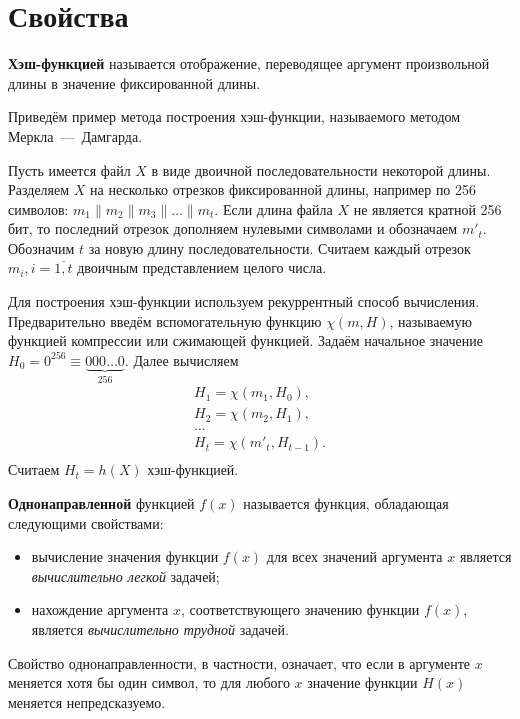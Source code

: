 \section{Свойства}

\textbf{Хэш-функцией} называется отображение, переводящее аргумент произвольной длины в значение фиксированной длины.

\example
Приведём пример метода построения хэш-функции, называемого методом Меркла~---~Дамгарда.~\cite{Merkle:1979, Merkle:1990, Damgard:1990}

Пусть имеется файл $X$ в виде двоичной последовательности некоторой длины. Разделяем $X$ на несколько отрезков фиксированной длины, например по 256 символов:  $m_{1} \| m_{2} \| m_{3} \| \ldots \| m_{t}$. Если длина файла $X$ не является кратной 256 бит, то последний отрезок дополняем нулевыми символами и обозначаем $m'_{t}$.
Обозначим $t$ за новую длину последовательности. Считаем каждый отрезок $m_i, i = \overline{1,t}$ двоичным представлением целого числа.

Для построения хэш-функции используем рекуррентный способ вычисления. Предварительно введём вспомогательную функцию $\chi(m, H)$, называемую функцией компрессии или сжимающей функцией. Задаём начальное значение $H_{0} = 0^{256} \equiv \underbrace{000 \ldots 0}_{256} $. Далее вычисляем
\[ \begin{array}{l}
    H_1 = \chi( m_1, H_0), \\
    H_2 = \chi( m_2, H_1), \\
    \dots \\
    H_t = \chi( m'_t, H_{t-1}). \\
\end{array} \]
Считаем $H_{t} = h(X)$ хэш-функцией.
\exampleend

\textbf{Однонаправленной} функцией $f(x)$ называется функция, обладающая следующими свойствами:
\begin{itemize}
    \item вычисление значения функции $f(x)$ для всех значений аргумента $x$ является \textit{вычислительно легкой} задачей;
    \item нахождение аргумента $x$, соответствующего значению функции $f(x)$, является \textit{вычислительно трудной} задачей.
\end{itemize}

Свойство однонаправленности, в частности, означает, что если в аргументе $x$ меняется хотя бы один символ, то для любого $x$ значение функции $H(x)$ меняется непредсказуемо.

